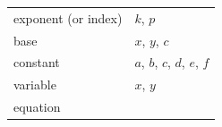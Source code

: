 {\begin{tabular}[t]{|l|l|}
     \tabularnewline\cline{1-1}\cline{2-2}
        exponent (or index) &
        $k$, $p$%
     \tabularnewline\cline{1-1}\cline{2-2}
        base &
        $x$, $y$, $c$%
     \tabularnewline\cline{1-1}\cline{2-2}
        constant &
        $a$, $b$, $c$, $d$, $e$, $f$%
     \tabularnewline\cline{1-1}\cline{2-2}
        variable &
        $x$, $y$%
     \tabularnewline\cline{1-1}\cline{2-2}
        equation &

\end{tabular}}
